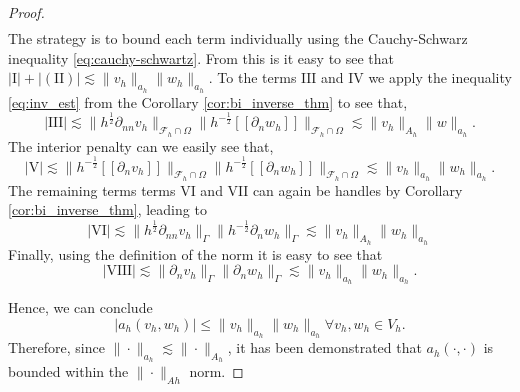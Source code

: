\documentclass[11pt]{article}
\theoremstyle{remark}
\newcommand{\jump}[1]{\left[\!\left[ #1 \right]\!\right]}
\newcommand{\abs}[1]{\left\lvert #1 \right\rvert}
\renewcommand{\le}{\leqslant}
\numberwithin{equation}{section}
\begin{document}
\begin{proof}
\begin{equation}
\begin{split}
                    \end{split}
                \end{equation}
                The strategy is to bound each term individually using the Cauchy-Schwarz inequality \eqref{eq:cauchy-schwartz}. From this is it easy to see that $\abs{ \mathrm{I}    } +  \abs{( \mathrm{II} )   }   \lesssim \| v_{h} \|_{a_{h}  }^{  } \| w_{h} \|_{ a_{h}
                }^{  } $. To the terms $
                \mathrm{III}  $ and  $ \mathrm{IV}  $ we apply the inequality \eqref{eq:inv_est} from the Corollary \ref{cor:bi_inverse_thm} to see that,
                \begin{equation}
                    \label{eq:invest_1}
                    \abs{\mathrm{III}   }  \lesssim  \|h^{\frac{1}{2}} \partial _{n n} v_{h}  \|_{ \mathcal{F}_{h}^{} \cap \Omega}^{  }\| h^{-\frac{1}{2}} \jump{ \partial _{n} w_{h} }     \|_{\mathcal{F}_{h}^{} \cap \Omega}^{  } \lesssim  \| v_{h} \|_{A_{h}
                    }^{  } \|w    \|_{ a_{h}}^{  }.
                \end{equation}
              The interior penalty can we easily see that,
              \begin{equation}
              \abs{  \mathrm{V}   }  \lesssim  \|h^{-\frac{1}{2}} \jump{ \partial _{n} v_{h}}  \|_{ \mathcal{F}_{h}^{} \cap \Omega }^{  }
             \|h^{-\frac{1}{2}} \jump{ \partial _{n} w_{h}}  \|_{ \mathcal{F}_{h}^{} \cap \Omega }^{  }  \lesssim  \| v_{h}  \|_{ a_{h} }^{  }
             \| w_{h}  \|_{ a_{h} }^{  }.
              \end{equation}
              The remaining terms terms $  \mathrm{VI} $ and $  \mathrm{VII} $ can again be handles by Corollary \ref{cor:bi_inverse_thm}, leading to
              \begin{equation}
                    \label{eq:invest_2}
                \abs{  \mathrm{VI}   }  \lesssim \| h^{\frac{1}{2}}\partial _{nn} v_{h} \|_{\Gamma   }^{  } \| h^{-\frac{1}{2}} \partial _{n}w_{h} \|_{\Gamma   }^{  }  \lesssim \|  v_{h} \|_{A_{h}  }^{  } \| w_{h} \|_{ a_{h}   }^{  }
              \end{equation}
             Finally, using the definition of the norm it is easy to see that
             \[
\abs{  \mathrm{VIII}   }  \lesssim \| \partial _{n}v_{h} \|_{ \Gamma  }^{  }
\| \partial _{n} w_{h} \|_{ \Gamma  }^{  }  \lesssim \| v_{h} \|_{ a_{h} }^{  }
\| w_{h} \|_{ a_{h} }^{  } .
             \]

             Hence, we can conclude \begin{equation}
                 \label{eq:ah_ahnorm}
                 \abs{ a_{h}( v_{h},w_{h})  } \le \| v_{h} \|_{ a_{h} }^{  } \| w_{h} \|_{ a_{h} }^{  } \forall v_{h},w_{h} \in V_{h}.
             \end{equation}
             Therefore, since $\| \cdot  \|_{a_{h}  }^{  } \lesssim  \| \cdot  \|_{A_{h}  }^{  } $, it has been demonstrated that $a_{h}( \cdot ,\cdot )$ is bounded within the $\|\cdot   \|_{A{h} }^{ }$ norm.


\end{proof}
\end{document}
